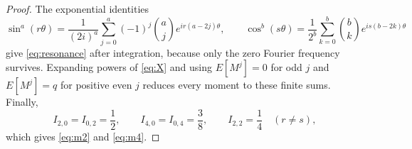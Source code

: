 \documentclass[11pt]{amsart}
\numberwithin{equation}{section}\setcounter{tocdepth}{3}\setcounter{secnumdepth}{3}
\begin{document}
\begin{proof}
The exponential identities
\begin{equation}
 \sin^a(r\theta)=\frac{1}{(2i)^a}
 \sum_{j=0}^a(-1)^j\binom aj e^{ir(a-2j)\theta},
 \qquad
 \cos^b(s\theta)=\frac{1}{2^b}
 \sum_{k=0}^b\binom bk e^{is(b-2k)\theta}
 \label{eq:moment_exponential_expansions}
\end{equation}
give \eqref{eq:resonance} after integration, because only the zero Fourier frequency
survives.  Expanding powers of \eqref{eq:X} and using
$E[M^j]=0$ for odd $j$ and $E[M^j]=q$ for positive even $j$ reduces every moment to
these finite sums.  Finally,
\begin{equation}
 I_{2,0}=I_{0,2}=\frac12,
 \qquad I_{4,0}=I_{0,4}=\frac38,
 \qquad I_{2,2}=\frac14\quad(r\ne s),
 \label{eq:low_order_harmonic_integrals}
\end{equation}
which gives \eqref{eq:m2} and \eqref{eq:m4}.
\end{proof}
\end{document}
